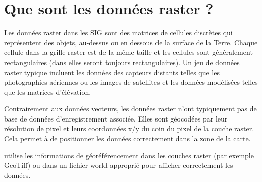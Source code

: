 \section{Que sont les données raster ?}\label{label_whatsraster}

Les données raster dans les SIG sont des matrices de cellules discrètes qui
représentent des objets, au-dessus ou en dessous de la surface de la Terre.
Chaque cellule dans la grille raster est de la même taille et les cellules sont
généralement rectangulaires (dans \qg elles seront toujours rectangulaires).
Un jeu de données raster typique incluent les données des capteurs distants
telles que les photographies aériennes ou les images de satellites et les
données modélisées telles que les matrices d'élévation.

Contrairement aux données vecteurs, les données raster n'ont typiquement pas de
base de données d'enregistrement associée. Elles sont géocodées par leur
résolution de pixel et leurs coordonnées x/y du coin du pixel de la couche
raster. Cela permet à \qg de positionner les données correctement dans la zone
de la carte.

\qg utilise les informations de géoréférencement dans les couches raster (par
exemple GeoTiff) ou dans un fichier world approprié pour afficher correctement
les données.

